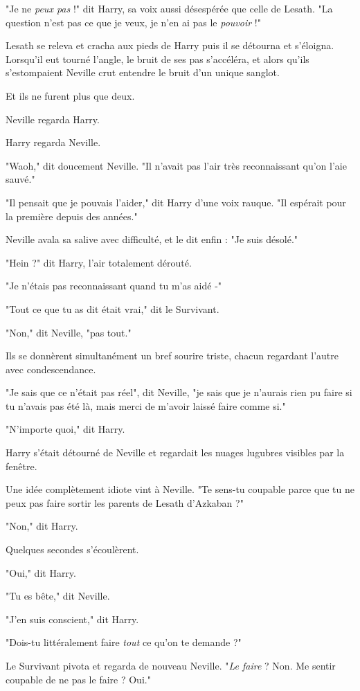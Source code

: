 "Je ne \emph{peux pas}  !" dit Harry, sa voix aussi désespérée que celle de Lesath. "La question n'est pas ce que je veux, je n'en ai pas le \emph{pouvoir}  !"

Lesath se releva et cracha aux pieds de Harry puis il se détourna et s'éloigna. Lorsqu'il eut tourné l'angle, le bruit de ses pas s'accéléra, et alors qu'ils s'estompaient Neville crut entendre le bruit d'un unique sanglot.

Et ils ne furent plus que deux.

Neville regarda Harry.

Harry regarda Neville.

"Waoh," dit doucement Neville. "Il n'avait pas l'air très reconnaissant qu'on l'aie sauvé."

"Il pensait que je pouvais l'aider," dit Harry d'une voix rauque. "Il espérait pour la première depuis des années."

Neville avala sa salive avec difficulté, et le dit enfin : "Je suis désolé."

"Hein ?" dit Harry, l'air totalement dérouté.

"Je n'étais pas reconnaissant quand tu m'as aidé -"

"Tout ce que tu as dit était vrai," dit le Survivant.

"Non," dit Neville, "pas tout."

Ils se donnèrent simultanément un bref sourire triste, chacun regardant l'autre avec condescendance.

"Je sais que ce n'était pas réel", dit Neville, "je sais que je n'aurais rien pu faire si tu n'avais pas été là, mais merci de m'avoir laissé faire comme si."

"N'importe quoi," dit Harry.

Harry s'était détourné de Neville et regardait les nuages lugubres visibles par la fenêtre.

Une idée complètement idiote vint à Neville. "Te sens-tu coupable parce que tu ne peux pas faire sortir les parents de Lesath d'Azkaban ?"

"Non," dit Harry.

Quelques secondes s'écoulèrent.

"Oui," dit Harry.

"Tu es bête," dit Neville.

"J'en suis conscient," dit Harry.

"Dois-tu littéralement faire \emph{tout}  ce qu'on te demande ?"

Le Survivant pivota et regarda de nouveau Neville. "\emph{Le faire}  ? Non. Me sentir coupable de ne pas le faire ? Oui."

